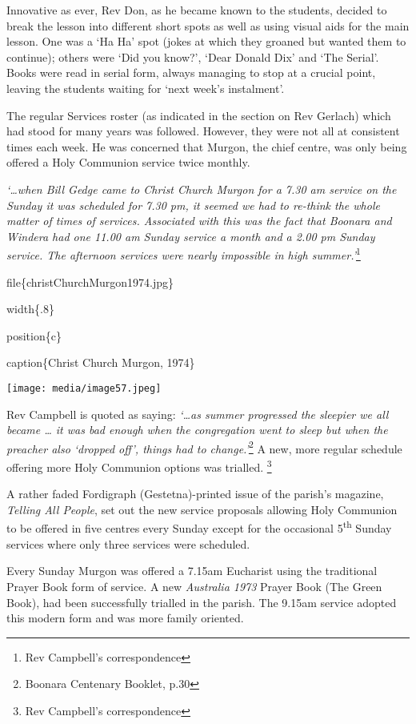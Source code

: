 Innovative as ever, Rev Don, as he became known to the students, decided to break the lesson into different short spots as well as using visual aids for the main lesson. One was a `Ha Ha' spot (jokes at which they groaned but wanted them to continue); others were `Did you know?', `Dear Donald Dix' and `The Serial'. Books were read in serial form, always managing to stop at a crucial point, leaving the students waiting for `next week's instalment'.

The regular Services roster (as indicated in the section on Rev Gerlach) which had stood for many years was followed. However, they were not all at consistent times each week. He was concerned that Murgon, the chief centre, was only being offered a Holy Communion service twice monthly.

\emph{`\ldots when Bill Gedge came to Christ Church Murgon for a 7.30 am service on the Sunday it was scheduled for 7.30 pm, it seemed we had to re-think the whole matter of times of services. Associated with this was the fact that Boonara and Windera had one 11.00 am Sunday service a month and a 2.00 pm Sunday service. The afternoon services were nearly impossible in high summer.'}\footnote{Rev Campbell's correspondence}

file\{christChurchMurgon1974.jpg\}

width\{.8\}

position\{c\}

caption\{Christ Church Murgon, 1974\}

\texttt{[image: media/image57.jpeg]}

Rev Campbell is quoted as saying: \emph{`\ldots as summer progressed the sleepier we all became \ldots{} it was bad enough when the congregation went to sleep but when the preacher also `dropped off', things had to change.'}\footnote{Boonara Centenary Booklet, p.30} A new, more regular schedule offering more Holy Communion options was trialled. \footnote{Rev Campbell's correspondence}

A rather faded Fordigraph (Gestetna)-printed issue of the parish's magazine, \emph{Telling All People}, set out the new service proposals allowing Holy Communion to be offered in five centres every Sunday except for the occasional 5\textsuperscript{th} Sunday services where only three services were scheduled.

Every Sunday Murgon was offered a 7.15am Eucharist using the traditional Prayer Book form of service. A new \emph{Australia 1973} Prayer Book (The Green Book), had been successfully trialled in the parish. The 9.15am service adopted this modern form and was more family oriented.

